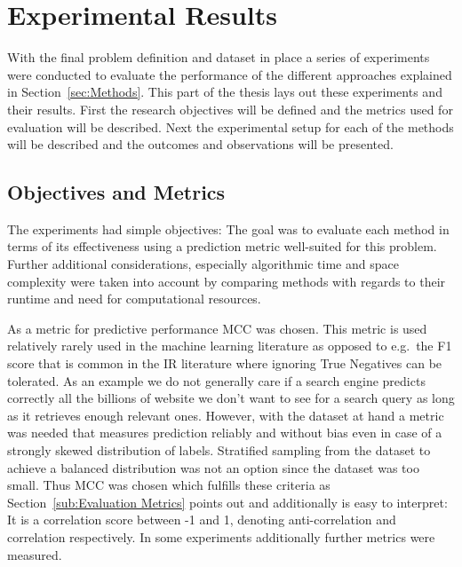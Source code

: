 
\thispagestyle{empty}

\section{Experimental Results}
\label{sec:Experimental Results}

With the final problem definition and dataset in place a series of experiments were conducted to evaluate the performance of the different approaches explained in Section~\ref{sec:Methods}.
This part of the thesis lays out these experiments and their results. First the research objectives will be defined and the metrics used for evaluation will be described. Next the experimental setup for each of the methods will be described and the outcomes and observations will be presented.

\subsection{Objectives and Metrics}
\label{sub:Objectives and Metrics}

The experiments had simple objectives: The goal was to evaluate each method in terms of its effectiveness using a prediction metric well-suited for this problem. Further additional considerations, especially algorithmic time and space complexity were taken into account by comparing methods with regards to their runtime and need for computational resources.


As a metric for predictive performance \gls{MCC} was chosen. This metric is used relatively rarely used in the machine learning literature as opposed to e.g.\ the F1 score that is common in the \gls{IR} literature where ignoring True Negatives can be tolerated. As an example we do not generally care if a search engine predicts correctly all the billions of website we don't want to see for a search query as long as it retrieves enough relevant ones.
However, with the dataset at hand a metric was needed that measures prediction reliably and without bias even in case of a strongly skewed distribution of labels. Stratified sampling from the dataset to achieve a balanced distribution was not an option since the dataset was too small. Thus \gls{MCC} was chosen which fulfills these criteria as Section~\ref{sub:Evaluation Metrics} points out and additionally is easy to interpret: It is a correlation score between -1 and 1, denoting anti-correlation and correlation respectively. In some experiments additionally further metrics were measured.

